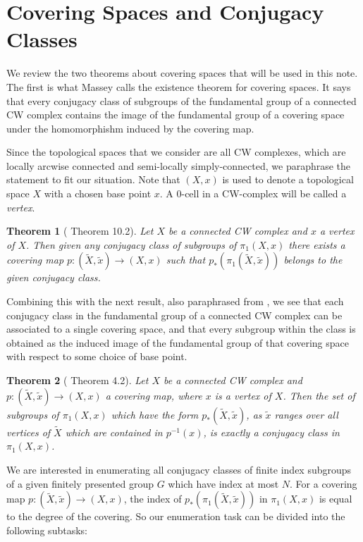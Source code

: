 \documentclass[12pt]{article}
\begin{document}
\section{Covering Spaces and Conjugacy Classes}

We review the two theorems about covering spaces that will be used in this note.
The first is what Massey calls the existence theorem for covering spaces.  It
says that every conjugacy class of subgroups of the fundamental group of a
connected CW complex contains the image of the fundamental group of a
covering space under the homomorphishm induced by the covering map.

Since the topological spaces that we consider are all CW complexes, which are
locally arcwise connected and semi-locally simply-connected, we paraphrase the
statement to fit our situation.  Note that $(X,x)$ is used to denote a
topological space $X$ with a chosen base point $x$.  A $0$-cell in a CW-complex
will be called a {\it vertex}.

\newtheorem*{thm}{Theorem}
\begin{thm}[\cite{Massey} Theorem 10.2]
  Let $X$ be a connected CW complex and $x$ a vertex of $X$.  Then given any
  conjugacy class of subgroups of $\pi_1(X, x)$ there exists a covering map
  $p:(\tilde X, \tilde x) \to (X, x)$ such that $p_*(\pi_1(\tilde X, \tilde x))$
  belongs to the given conjugacy class.
\end{thm}

Combining this with the next result, also paraphrased from \cite{Massey}, we see that
each conjugacy class in the fundamental group of a connected CW complex can be
associated to a single covering space, and that every subgroup within the class
is obtained as the induced image of the fundamental group of that covering space
with respect to some choice of base point.

\begin{thm}[\cite{Massey} Theorem 4.2]
  Let $X$ be a connected CW complex and $p:(\tilde X, \tilde x )\to(X, x)$ a
  covering map, where $x$ is a vertex of $X$. Then the set of subgroups of
  $\pi_1(X, x)$ which have the form $p_*(\tilde X, \tilde x)$, as $\tilde x$
  ranges over all vertices of $\tilde X$ which are contained in $p^{-1}(x)$, is
  exactly a conjugacy class in $\pi_1(X, x)$.
  \end{thm}

  We are interested in enumerating all conjugacy classes of finite index subgroups
  of a given finitely presented group $G$ which have index at most $N$.  For a covering map
  $p:(\tilde X, \tilde x)\to (X, x)$, the index of $p_*(\pi_1(\tilde X, \tilde x))$
  in $\pi_1(X, x)$ is equal to the degree of the covering.  So our enumeration
  task can be divided into the following subtasks:
\end{document}
